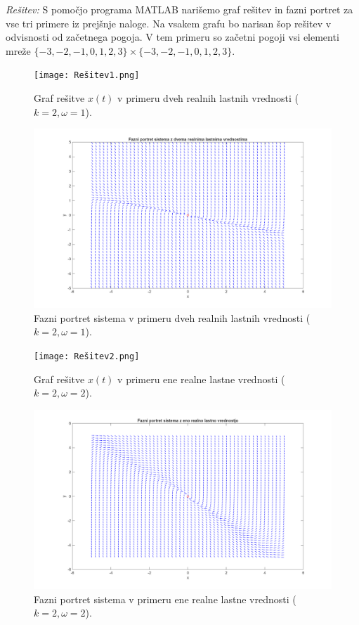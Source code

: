 \documentclass[a4paper, 10pt]{article}
\newenvironment{Rešitev}{\begin{flushleft}\textit{Rešitev:}}{\hfill\end{flushleft}}
\begin{document}
		\begin{Rešitev}
			S pomočjo programa MATLAB narišemo graf rešitev in fazni portret za vse tri primere iz prejšnje naloge. Na vsakem grafu bo narisan šop rešitev v odvisnosti od začetnega pogoja. V tem primeru so začetni pogoji vsi elementi mreže $\{-3, -2, -1, 0, 1, 2, 3\}\times\{-3, -2, -1, 0, 1, 2, 3\}$.
			\begin{figure}[H]
				\centering
				\texttt{[image: Rešitev1.png]}
				\caption{Graf rešitve $x(t)$ v primeru dveh realnih lastnih vrednosti ($k=2, \omega=1$).}
							
				\includegraphics[scale=0.5]{Fazni1.png}
				\caption{Fazni portret sistema v primeru dveh realnih lastnih vrednosti ($k=2, \omega=1$).}
			\end{figure}
			
			
			\begin{figure}[H]
				\texttt{[image: Rešitev2.png]}
				\caption{Graf rešitve $x(t)$ v primeru ene realne lastne vrednosti ($k=2, \omega=2$).}
			
				\includegraphics[scale=0.5]{Fazni2.png}
				\caption{Fazni portret sistema v primeru ene realne lastne vrednosti ($k=2, \omega=2$).}
			\end{figure}
			

\end{Rešitev}
\end{document}
